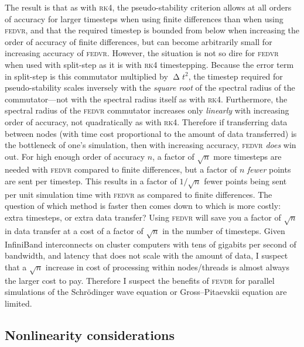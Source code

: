 The result is that as with \textsc{rk4}, the pseudo-stability criterion allows at all orders of accuracy for larger timesteps when using finite differences than when using \textsc{fedvr}, and that the required timestep is bounded from below when increasing the order of accuracy of finite differences, but can become arbitrarily small for increasing accuracy of \textsc{fedvr}. However, the situation is not so dire for \textsc{fedvr} when used with split-step as it is with \textsc{rk4} timestepping. Because the error term in split-step is this commutator multiplied by $\upDelta t^2$, the timestep required for pseudo-stability scales inversely with the \emph{square root} of the spectral radius of the commutator---not with the spectral radius itself as with \textsc{rk4}. Furthermore, the spectral radius of the \textsc{fedvr} commutator increases only \emph{linearly} with increasing order of accuracy, not quadratically as with \textsc{rk4}. Therefore if transferring data between nodes (with time cost proportional to the amount of data transferred) is the bottleneck of one's simulation, then with increasing accuracy, \textsc{fedvr} \emph{does} win out. For high enough order of accuracy $n$, a factor of $\sqrt{n}$ more timesteps are needed with \textsc{fedvr} compared to finite differences, but a factor of $n$ \emph{fewer} points are sent per timestep. This results in a factor of $1/\sqrt{n}$ fewer points being sent per unit simulation time with \textsc{fedvr} as compared to finite differences. The question of which method is faster then comes down to which is more costly: extra timesteps, or extra data transfer? Using \textsc{fedvr} will save you a factor of $\sqrt{n}$ in data transfer at a cost of a factor of $\sqrt{n}$ in the number of timesteps. Given InfiniBand interconnects on cluster computers with tens of gigabits per second of bandwidth, and latency that does not scale with the amount of data, I suspect that a $\sqrt{n}$ increase in cost of processing within nodes/threads is almost always the larger cost to pay. Therefore I suspect the benefits of \textsc{fevdr} for parallel simulations of the Schr\"odinger wave equation or Gross--Pitaevskii equation are limited.

\subsection{Nonlinearity considerations}\label{sec:FEDVR_nonlinearity}

